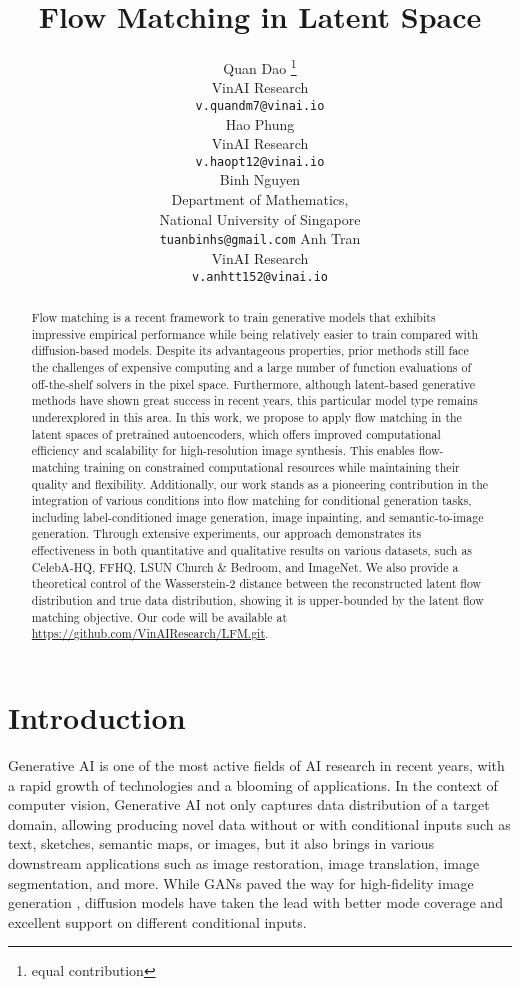 \documentclass{article}
\title{Flow Matching in Latent Space}
\author{Quan Dao \thanks{equal contribution} \\
  VinAI Research\\
  \texttt{v.quandm7@vinai.io} \\
\And
  Hao Phung \footnotemark[1] \\
  VinAI Research\\
  \texttt{v.haopt12@vinai.io} \\
  \And
  Binh Nguyen \\
  Department of Mathematics, \\
  National University of Singapore\\
    \texttt{tuanbinhs@gmail.com}
  \AND
  Anh Tran \\
  VinAI Research\\
  \texttt{v.anhtt152@vinai.io} \\
}
\theoremstyle{plain}
\theoremstyle{definition}
\theoremstyle{remark}
\begin{document}
\maketitle


\begin{abstract}
Flow matching is a recent framework to train generative models that exhibits impressive empirical performance while being relatively easier to train compared with diffusion-based models.
 Despite its advantageous properties, prior methods still face the challenges of expensive computing and a large number of function evaluations of off-the-shelf solvers in the pixel space. Furthermore, although latent-based generative methods have shown great success in recent years, this particular model type remains underexplored in this area. In this work, we propose to apply flow matching in the latent spaces of pretrained autoencoders, which offers improved computational efficiency and scalability for high-resolution image synthesis. This enables flow-matching training on constrained computational resources while maintaining their quality and flexibility.
 Additionally, our work stands as a pioneering contribution in the integration of various conditions into flow matching for conditional generation tasks, including label-conditioned image generation, image inpainting, and semantic-to-image generation. Through extensive experiments, our approach demonstrates its effectiveness in both quantitative and qualitative results on various datasets, such as CelebA-HQ, FFHQ, LSUN Church \& Bedroom, and ImageNet. We also provide a theoretical control of the Wasserstein-2 distance between the reconstructed latent flow distribution and true data distribution, showing it is upper-bounded by the latent flow matching objective. Our code will be available at \href{https://github.com/VinAIResearch/LFM.git}{https://github.com/VinAIResearch/LFM.git}.
\end{abstract}


\section{Introduction}
Generative AI is one of the most active fields of AI research in recent years, with a rapid growth of technologies and a blooming of applications. In the context of computer vision, Generative AI not only captures data distribution of a target domain, allowing producing novel data without or with conditional inputs such as text, sketches, semantic maps, or images, but it also brings in various downstream applications such as image restoration, image translation, image segmentation, and more.
While GANs paved the way for high-fidelity image generation \cite{brock2018large}, diffusion models \cite{dhariwal2021diffusion,huang2021variational,kingma2021variational,song2021maximum,xiao2021tackling} have taken the lead with better mode coverage and excellent support on different conditional inputs.
\end{document}
